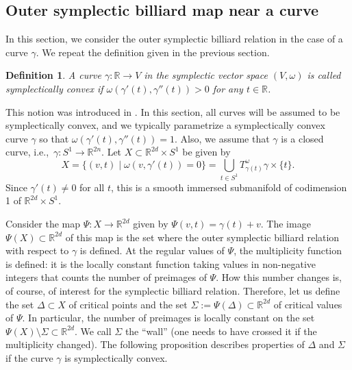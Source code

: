 \documentclass[12pt]{article}
\newtheorem{definition}[lemma]{Definition}
\newcommand{\g}{{\gamma}}
\newcommand{\R}{{\mathbb R}}
\begin{document}
\subsection{Outer symplectic billiard map near a curve} \label{subsect:near}

In this section, we consider the outer symplectic billiard relation in the case of a curve $\gamma$. We repeat the definition given in the previous section.

\begin{definition}
{\rm    
A curve $\gamma: \R \to V$ in the symplectic vector space $(V,\omega)$ is called symplectically convex if  $\omega(\gamma'(t), \gamma''(t)) > 0$ for any $t\in \R$.
}
\end{definition}

This notion was introduced in \cite{AT}. In this section, all curves will be assumed to be symplectically convex, and we typically parametrize a symplectically convex curve $\gamma$ so that $\omega(\gamma'(t),\gamma''(t))=1$. Also, we assume that $\g$ is a closed curve, i.e.,~$\g:S^1\to\R^{2n}$. Let $X\subset \R^{2d}\times S^1$ be given by 
$$
X=\{(v,t) \mid \omega(v,\gamma'(t))=0\}=\bigcup_{t\in S^1} T_{\gamma(t)}^\omega\gamma\times\{t\}.
$$ 
Since $\gamma'(t)\neq0$ for all $t$, this is a smooth immersed submanifold of codimension 1 of $\R^{2d}\times S^1$.

Consider the map $\Psi:X\to\R^{2d}$ given by $\Psi(v,t)=\gamma(t)+v$. The image $\Psi(X)\subset\R^{2d}$ of this map is the set where the outer symplectic billiard relation with respect to $\gamma$ is defined. At the regular values of $\Psi$, the multiplicity function is defined: it is the locally constant function taking values in non-negative integers that counts the number of preimages of $\Psi$. How this number changes is, of course, of interest for the symplectic billiard relation. Therefore, let us define the set $\Delta\subset X$ of critical points and the set $\Sigma:=\Psi(\Delta)\subset\R^{2d}$ of critical values of $\Psi$. In particular, the number of preimages is locally constant on the set $\Psi(X)\setminus\Sigma\subset\R^{2d}$. We call $\Sigma$ the ``wall'' (one needs to have crossed it if the multiplicity changed). The following proposition describes properties of $\Delta$ and $\Sigma$ if the curve $\gamma$ is symplectically convex.
 
\end{document}
